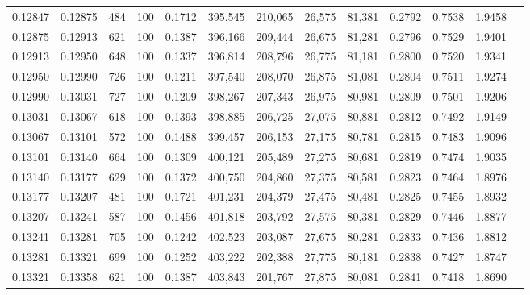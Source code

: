 \begin{tabular}{rrrrrrrrrrrrr}
0.12847 & 0.12875 &   484 & 100 &                                     0.1712 & 395,545 & 210,065 &  26,575 &  81,381 & 0.2792 & 0.7538 & 1.9458 \\
0.12875 & 0.12913 &   621 & 100 &                                     0.1387 & 396,166 & 209,444 &  26,675 &  81,281 & 0.2796 & 0.7529 & 1.9401 \\
0.12913 & 0.12950 &   648 & 100 &                                     0.1337 & 396,814 & 208,796 &  26,775 &  81,181 & 0.2800 & 0.7520 & 1.9341 \\
0.12950 & 0.12990 &   726 & 100 &                                     0.1211 & 397,540 & 208,070 &  26,875 &  81,081 & 0.2804 & 0.7511 & 1.9274 \\
0.12990 & 0.13031 &   727 & 100 &                                     0.1209 & 398,267 & 207,343 &  26,975 &  80,981 & 0.2809 & 0.7501 & 1.9206 \\
0.13031 & 0.13067 &   618 & 100 &                                     0.1393 & 398,885 & 206,725 &  27,075 &  80,881 & 0.2812 & 0.7492 & 1.9149 \\
0.13067 & 0.13101 &   572 & 100 &                                     0.1488 & 399,457 & 206,153 &  27,175 &  80,781 & 0.2815 & 0.7483 & 1.9096 \\
0.13101 & 0.13140 &   664 & 100 &                                     0.1309 & 400,121 & 205,489 &  27,275 &  80,681 & 0.2819 & 0.7474 & 1.9035 \\
0.13140 & 0.13177 &   629 & 100 &                                     0.1372 & 400,750 & 204,860 &  27,375 &  80,581 & 0.2823 & 0.7464 & 1.8976 \\
0.13177 & 0.13207 &   481 & 100 &                                     0.1721 & 401,231 & 204,379 &  27,475 &  80,481 & 0.2825 & 0.7455 & 1.8932 \\
0.13207 & 0.13241 &   587 & 100 &                                     0.1456 & 401,818 & 203,792 &  27,575 &  80,381 & 0.2829 & 0.7446 & 1.8877 \\
0.13241 & 0.13281 &   705 & 100 &                                     0.1242 & 402,523 & 203,087 &  27,675 &  80,281 & 0.2833 & 0.7436 & 1.8812 \\
0.13281 & 0.13321 &   699 & 100 &                                     0.1252 & 403,222 & 202,388 &  27,775 &  80,181 & 0.2838 & 0.7427 & 1.8747 \\
0.13321 & 0.13358 &   621 & 100 &                                     0.1387 & 403,843 & 201,767 &  27,875 &  80,081 & 0.2841 & 0.7418 & 1.8690 \\

\end{tabular}
